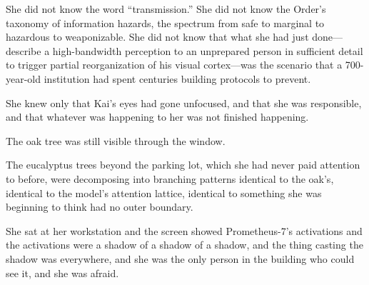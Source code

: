 She did not know the word ``transmission.'' She did not know the Order's taxonomy of information hazards, the spectrum from safe to marginal to hazardous to weaponizable. She did not know that what she had just done---describe a high-bandwidth perception to an unprepared person in sufficient detail to trigger partial reorganization of his visual cortex---was the scenario that a 700-year-old institution had spent centuries building protocols to prevent.

She knew only that Kai's eyes had gone unfocused, and that she was responsible, and that whatever was happening to her was not finished happening.

The oak tree was still visible through the window.

The eucalyptus trees beyond the parking lot, which she had never paid attention to before, were decomposing into branching patterns identical to the oak's, identical to the model's attention lattice, identical to something she was beginning to think had no outer boundary.

She sat at her workstation and the screen showed Prometheus-7's activations and the activations were a shadow of a shadow of a shadow, and the thing casting the shadow was everywhere, and she was the only person in the building who could see it, and she was afraid.

